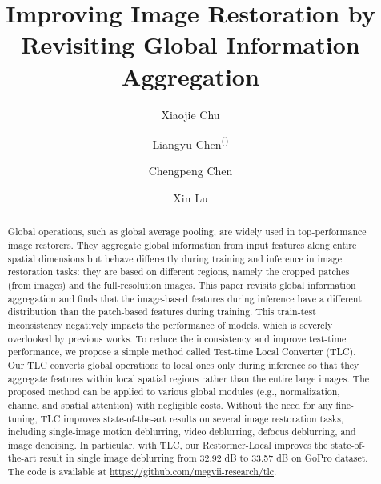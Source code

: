 \documentclass[runningheads]{llncs}
\begin{document}
\pagestyle{headings}
\mainmatter
\def\ECCVSubNumber{3129}  

\title{Improving Image Restoration by Revisiting Global Information Aggregation} 

\begin{comment}
\titlerunning{ECCV-22 submission ID \ECCVSubNumber} 
\authorrunning{ECCV-22 submission ID \ECCVSubNumber} 
\author{Anonymous ECCV submission}
\institute{Paper ID \ECCVSubNumber}
\end{comment}


\author{Xiaojie Chu \and
Liangyu Chen\textsuperscript{(\Letter)}\and
Chengpeng Chen \and
Xin Lu}
\maketitle

\begin{abstract}
Global operations, such as global average pooling, are widely used in top-performance image restorers. They aggregate global information from input features along entire spatial dimensions but behave differently during training and inference in image restoration tasks: they are based on different regions, namely the cropped patches (from images) and the full-resolution images. This paper revisits global information aggregation and finds that the image-based features during inference have a different distribution than the patch-based features during training. This train-test inconsistency negatively impacts the performance of models, which is severely overlooked by previous works. To reduce the inconsistency and improve test-time performance, we propose a simple method called Test-time Local Converter (TLC). Our TLC converts global operations to local ones only during inference so that they aggregate features within local spatial regions rather than the entire large images. The proposed method can be applied to various global modules (e.g., normalization, channel and spatial attention) with negligible costs. Without the need for any fine-tuning, TLC improves state-of-the-art results on several image restoration tasks, including single-image motion deblurring, video deblurring, defocus deblurring, and image denoising. In particular, with TLC, our Restormer-Local improves the state-of-the-art result in single image deblurring from 32.92 dB to 33.57 dB on GoPro dataset. The code is available at \url{https://github.com/megvii-research/tlc}.
\end{abstract}
\end{document}
